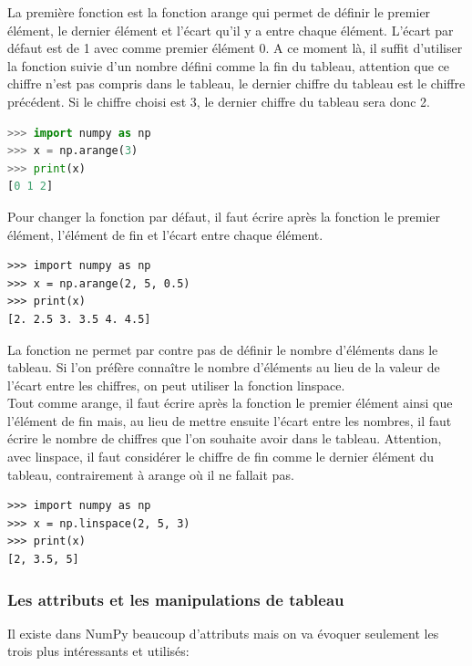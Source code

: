 \documentclass[a4paper, 12pt]{article}
\numberwithin{equation}{subsection}
\begin{document}
La première fonction est la fonction arange qui permet de définir le premier élément, le dernier élément et l’écart qu’il y a entre chaque élément. L’écart par défaut est de 1 avec comme premier élément 0. A ce moment là, il suffit d’utiliser la fonction suivie d’un nombre défini comme la fin du tableau, attention que ce chiffre n’est pas compris dans le tableau, le dernier chiffre du tableau est le chiffre précédent. Si le chiffre choisi est 3, le dernier chiffre du tableau sera donc 2.
\begin{lstlisting}[language=Python]
>>> import numpy as np
>>> x = np.arange(3)
>>> print(x)
[0 1 2]
\end{lstlisting}
Pour changer la fonction par défaut, il faut écrire après la fonction le premier élément, l’élément de fin et l’écart entre chaque élément.
\begin{lstlisting}
>>> import numpy as np
>>> x = np.arange(2, 5, 0.5)
>>> print(x)
[2. 2.5 3. 3.5 4. 4.5]
\end{lstlisting}
La fonction ne permet par contre pas de définir le nombre d’éléments dans le tableau. Si l’on préfère connaître le nombre d’éléments au lieu de la valeur de l’écart entre les chiffres, on peut utiliser la fonction linspace. \\

Tout comme arange, il faut écrire après la fonction le premier élément ainsi que l’élément de fin mais, au lieu de mettre ensuite l’écart entre les nombres, il faut écrire le nombre de chiffres que l’on souhaite avoir dans le tableau. Attention, avec linspace, il faut considérer le chiffre de fin comme le dernier élément du tableau, contrairement à arange où il ne fallait pas.
\begin{lstlisting}
>>> import numpy as np
>>> x = np.linspace(2, 5, 3)
>>> print(x)
[2, 3.5, 5]
\end{lstlisting}
\subsubsection{Les attributs et les manipulations de tableau}
Il existe dans NumPy beaucoup d’attributs mais on va évoquer seulement les trois plus intéressants et utilisés: \\
\end{document}
